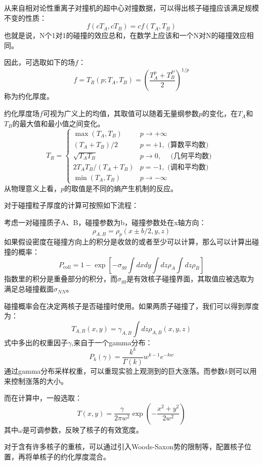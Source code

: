 \documentclass[aps,pre,12pt,preprint,onecolumn,showpacs,showkeys]{revtex4-1}
\begin{document}
\par
从来自相对论性重离子对撞机的超中心对撞数据，可以得出核子碰撞应该满足规模不变的性质：
\begin{equation}
    f(cT_A,cT_B)=cf(T_A,T_B)
\end{equation}
也就是说，N个1对1的碰撞的效应总和，在数学上应该和一个N对N的碰撞效应相同。\par
因此，可选取如下的场$f$：
\begin{equation}
    f=T_R(p;T_A,T_B)=(\frac{T^p_A+T^P_B}{2})^{1/p}
\end{equation}
称为约化厚度。\par
约化厚度场$f$可视为广义上的均值，其取值可以随着无量纲参数$p$的变化，在$T_A$和$T_B$的最大值和最小值之间变化。
\begin{equation}
T_{R}=\left\{\begin{array}{ll}{\max \left(T_{A}, T_{B}\right)} & {p \rightarrow+\infty} \\ 
{\left(T_{A}+T_{B}\right) / 2} & {p=+1, \text { (算数平均数) }} \\ 
{\sqrt{T_{A} T_{B}}} & {p\to0, \quad \text { (几何平均数) }} \\ 
{2 T_{A} T_{B} /\left(T_{A}+T_{B}\right)} & {p=-1, \text { (调和平均数) }} \\ 
{\min \left(T_{A}, T_{B}\right)} & {p \rightarrow-\infty}\end{array}\right.
\end{equation}
从物理意义上看，$p$的取值是不同的熵产生机制的反应。\par
对于碰撞粒子厚度的计算可按照如下流程：\par
考虑一对碰撞质子A、B，碰撞参数为b，碰撞参数处在x轴方向：
\begin{equation}
    \rho_{A,B}=\rho_{p}(x\pm b/2,y,z)
\end{equation}
如果假设密度在碰撞方向上的积分是收敛的或者至少可以计算，那么可以计算出碰撞的概率：
\begin{equation}
    P_{\mathrm{coll}}=1-\exp \left[-\sigma_{g g} \int d x d y \int d z \rho_{A} \int d z \rho_{B}\right]
\end{equation}
指数里的积分是重叠部分的积分，而$\sigma_{gg}$是有效核子碰撞界面，其取值应被选取为满足总碰撞截面$\sigma_{NN}$。
\par
碰撞概率会在决定两核子是否碰撞时使用。如果两质子碰撞了，我们可以得到厚度为：
\begin{equation}
    T_{A,B}(x,y)=\gamma_{A,B}\int dz \rho_{A,B}(x,y,z)
\end{equation}
式中多出的权重因子$\gamma$,来自于一个gamma分布：
\begin{equation}
    P_{k}(\gamma)=\frac{k^{k}}{\Gamma(k)} w^{k-1} e^{-k w}
\end{equation}
通过gamma分布采样权重，可以重现实验上观测到的巨大涨落。而参数$k$则可以用来控制涨落的大小。\par
而在计算中，一般选取：
\begin{equation}
    T(x, y)=\frac{\gamma}{2 \pi w^{2}} \exp \left(-\frac{x^{2}+y^{2}}{2 w^{2}}\right)
\end{equation}
其中$\omega$是可调参数，反映了核子的有效宽度。\par
对于含有许多核子的重核，可以通过引入Woods-Saxon势的限制等，配置核子位置，再将单核子的约化厚度混合。
\end{document}
